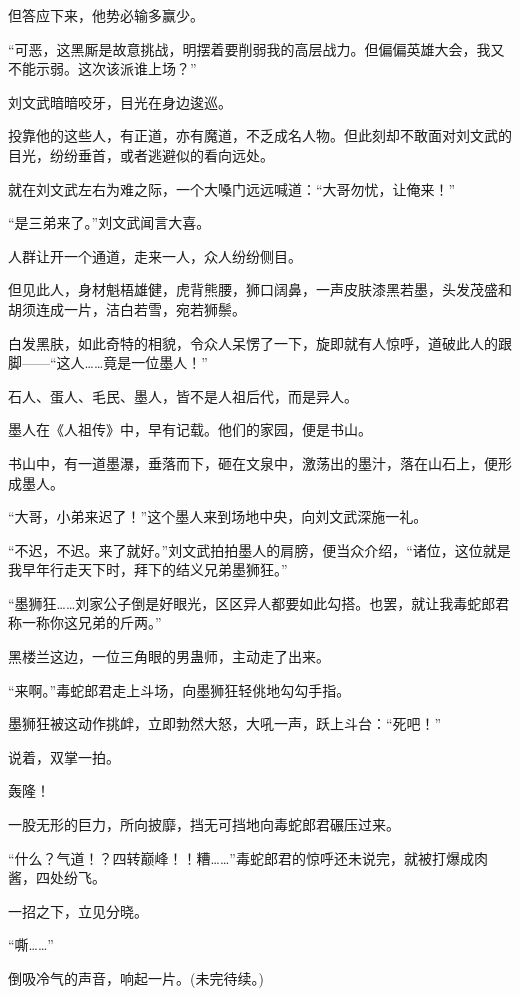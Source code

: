 \begin{this_body}
但答应下来，他势必输多赢少。

“可恶，这黑厮是故意挑战，明摆着要削弱我的高层战力。但偏偏英雄大会，我又不能示弱。这次该派谁上场？”

刘文武暗暗咬牙，目光在身边逡巡。

投靠他的这些人，有正道，亦有魔道，不乏成名人物。但此刻却不敢面对刘文武的目光，纷纷垂首，或者逃避似的看向远处。

就在刘文武左右为难之际，一个大嗓门远远喊道：“大哥勿忧，让俺来！”

“是三弟来了。”刘文武闻言大喜。

人群让开一个通道，走来一人，众人纷纷侧目。

但见此人，身材魁梧雄健，虎背熊腰，狮口阔鼻，一声皮肤漆黑若墨，头发茂盛和胡须连成一片，洁白若雪，宛若狮鬃。

白发黑肤，如此奇特的相貌，令众人呆愣了一下，旋即就有人惊呼，道破此人的跟脚——“这人……竟是一位墨人！”

石人、蛋人、毛民、墨人，皆不是人祖后代，而是异人。

墨人在《人祖传》中，早有记载。他们的家园，便是书山。

书山中，有一道墨瀑，垂落而下，砸在文泉中，激荡出的墨汁，落在山石上，便形成墨人。

“大哥，小弟来迟了！”这个墨人来到场地中央，向刘文武深施一礼。

“不迟，不迟。来了就好。”刘文武拍拍墨人的肩膀，便当众介绍，“诸位，这位就是我早年行走天下时，拜下的结义兄弟墨狮狂。”

“墨狮狂……刘家公子倒是好眼光，区区异人都要如此勾搭。也罢，就让我毒蛇郎君称一称你这兄弟的斤两。”

黑楼兰这边，一位三角眼的男蛊师，主动走了出来。

“来啊。”毒蛇郎君走上斗场，向墨狮狂轻佻地勾勾手指。

墨狮狂被这动作挑衅，立即勃然大怒，大吼一声，跃上斗台：“死吧！”

说着，双掌一拍。

轰隆！

一股无形的巨力，所向披靡，挡无可挡地向毒蛇郎君碾压过来。

“什么？气道！？四转巅峰！！糟……”毒蛇郎君的惊呼还未说完，就被打爆成肉酱，四处纷飞。

一招之下，立见分晓。

“嘶……”

倒吸冷气的声音，响起一片。(未完待续。)

\end{this_body}


